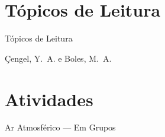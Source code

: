 \section{Tópicos de Leitura}

    \begin{frame}{Tópicos de Leitura}
        \begin{thebibliography}{Çengel, Y.~A., 2013}
                Çengel, Y.~A. e Boles, M.~A.
        \end{thebibliography}
    \end{frame}

\section{Atividades}

    \begin{frame}{Ar Atmosférico --- Em Grupos}\vspace*{-0em}
    \end{frame}




